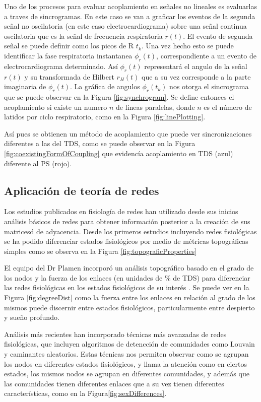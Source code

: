 \documentclass[twoside,twocolumn]{article}
\begin{document}
Uno de los procesos para evaluar acoplamiento en señales no lineales es evaluarlas a traves de sincrogramas.
En este caso se van a graficar los eventos de la segunda señal no oscilatoria (en este caso electrocardiograma) sobre una señal continua oscilatoria que es la señal de frecuencia respiratoria $r(t)$. El evento de segunda señal se puede definir como los picos de R $t_k$.
Una vez hecho esto se puede identificar la fase respiratoria instantanea $\phi_r(t)$, correspondiente a un evento de electrocardiograma determinado. Así  $\phi_r(t)$ representará el angulo de la señal $r(t)$ y su transformada de Hilbert $r_H(t)$ que a su vez corresponde a la parte imaginaria de $\phi_r(t)$.
La gráfica de angulos $\phi_r(t_k)$ nos otorga el sincrograma que se puede observar en la Figura \ref{fig:synchrogram}. Se define entonces el acoplamiento si existe un numero $n$ de lineas paralelas, donde $n$ es el número de latidos por ciclo respiratorio, como en la Figura \ref{fig:linePlotting}.

Así pues se obtienen un método de acoplamiento que puede ver sincronizaciones diferentes a las del TDS, como se puede observar en la Figura \ref{fig:coexistingFormOfCoupling} que evidencía acoplamiento en TDS (azul) diferente al PS (rojo).

\subsection{Aplicación de teoría de redes}
Los estudios publicados en fisiología de redes han utilizado desde sus inicios análisis básicos de redes para obtener información posterior a la creación de sus matricesd de adyacencia.
Desde los primeros estudios incluyendo redes fisiológicas se ha podido diferenciar estados fisiológicos por medio de métricas topográficas simples como se observa en la Figura \ref{fig:topograficProperties}

El equipo del Dr Plamen incorporó un análisis topográfico basado en el grado de los nodos y la fuerza de los enlaces (en unidades de \% de TDS) para diferenciar las redes fisiológicas en los estados fisiológicos de su interés \cite{bashan2012network}\cite{2015Plasticity}.
Se puede ver en la Figura \ref{fig:degreeDist} como la fuerza entre los enlaces en relación al grado de los mismos puede discernir entre estados fisiológicos, particularmente entre despierto y sueño profundo.

Análisis más recientes han incorporado técnicas más avanzadas de redes fisiológicas, que incluyen algoritmos de detencción de comunidades como Louvain y caminantes aleatorios\cite{barajas2021sex}\cite{barajas2021physiological}\cite{easton2020metabolic}\cite{chmiel2014spreading}.
Estas técnicas nos permiten observar como se agrupan los nodos en diferentes estados fisiológicos, y llama la atención como en ciertos estados, los mismos nodos se agrupan en diferentes comunidades, y además que las comunidades tienen diferentes enlaces que a su vez tienen diferentes características, como en la Figura\ref{fig:sexDifferences}.
\end{document}
